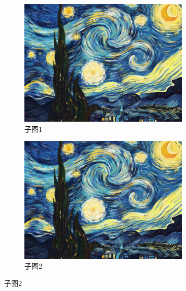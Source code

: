 \begin{figure}[htbp]
	\centering
	\begin{subfigure}[t]{0.4\textwidth}
		\centering
		\includegraphics[width=0.9\textwidth]{figures/test}
		\caption{子图1}
	\end{subfigure}
	\qquad
	\begin{subfigure}[t]{0.4\textwidth}
		\centering
		\includegraphics[width=0.9\textwidth]{figures/test}
		\caption{子图2}
	\end{subfigure}
\end{figure}

